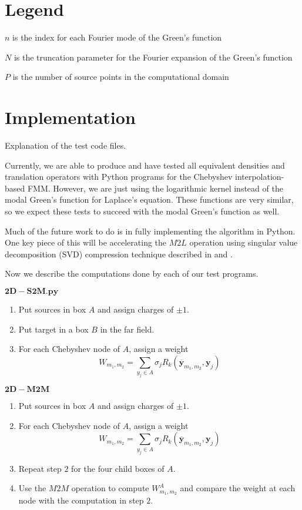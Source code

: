\documentclass[11pt, oneside]{article}   	%
\begin{document}
\begin{appendices}
\section{Legend}
$n$ is the index for each Fourier mode of the Green's function

$N$ is the truncation parameter for the Fourier expansion of the Green's function

$P$ is the number of source points in the computational domain



\section{Implementation}
Explanation of the test code files.

Currently, we are able to produce and have tested all equivalent densities and translation operators with Python programs for the Chebyshev interpolation-based FMM. However, we are just using the logarithmic kernel instead of the modal Green's function for Laplace's equation. These functions are very similar, so we expect these tests to succeed with the modal Green's function as well.

Much of the future work to do is in fully implementing the algorithm in Python. One key piece of this will be accelerating the $M2L$ operation using singular value decomposition (SVD) compression technique described in \cite{MV} and \cite{FD}.

Now we describe the computations done by each of our test programs.

$\mathbf{2D-S2M.py}$
\begin{enumerate}
\item Put sources in box $A$ and assign charges of $\pm 1$.
\item Put target in a box $B$ in the far field.
\item For each Chebyshev node of $A$, assign a weight\\
$$W_{m_1,m_2}=\sum_{y_j\in A} \sigma_jR_k(\mathbf{\overline{y}}_{m_1,m_2},\mathbf{y}_j)$$

\end{enumerate}

$\mathbf{2D-M2M}$
\begin{enumerate}
\item Put sources in box $A$ and assign charges of $\pm 1$.
\item For each Chebyshev node of $A$, assign a weight\\
$$W_{m_1,m_2}=\sum_{y_j\in A}\sigma_jR_k(\mathbf{\overline{y}}_{m_1,m_2},\mathbf{y}_j)$$
\item Repeat step $2$ for the four child boxes of $A$.
\item Use the $M2M$ operation to compute $W^A_{m_1,m_2}$ and compare the weight at each node with the computation in step $2$.
\end{enumerate}



\end{appendices}
\end{document}
